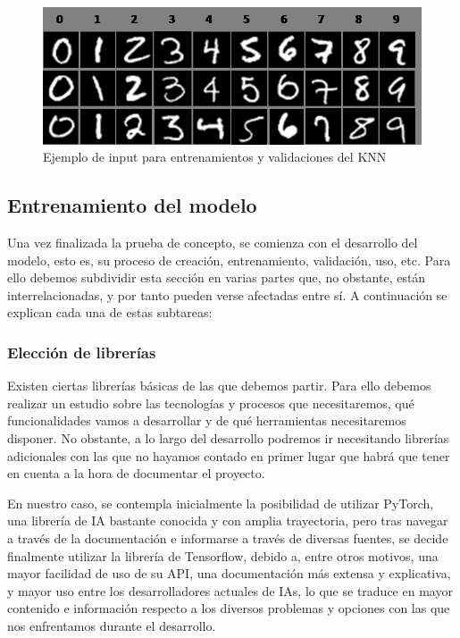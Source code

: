 \documentclass{article}
\begin{document}
\begin{figure}[!ht]
	\centering
	\label{fig:mnist}
	\includegraphics[scale=0.5]{pics/mnist_numbers.png}
	\caption{Ejemplo de input para entrenamientos y validaciones del KNN}
\end{figure}



\subsection{Entrenamiento del modelo}
Una vez finalizada la prueba de concepto, se comienza con el desarrollo del modelo, esto es, su proceso de creación, entrenamiento, validación, uso, etc. Para ello debemos subdividir esta sección en varias partes que, no obstante, están interrelacionadas, y por tanto pueden verse afectadas entre sí. A continuación se explican cada una de estas subtareas:

\subsubsection{Elección de librerías}
Existen ciertas librerías básicas de las que debemos partir. Para ello debemos realizar un estudio sobre las tecnologías y procesos que necesitaremos, qué funcionalidades vamos a desarrollar y de qué herramientas necesitaremos disponer. No obstante, a lo largo del desarrollo podremos ir necesitando librerías adicionales con las que no hayamos contado en primer lugar que habrá que tener en cuenta a la hora de documentar el proyecto.

En nuestro caso, se contempla inicialmente la posibilidad de utilizar PyTorch, una librería de IA bastante conocida y con amplia trayectoria, pero tras navegar a través de la documentación e informarse a través de diversas fuentes, se decide finalmente utilizar la librería de Tensorflow, debido a, entre otros motivos, una mayor facilidad de uso de su API, una documentación más extensa y explicativa, y mayor uso entre los desarrolladores actuales de IAs, lo que se traduce en mayor contenido e información respecto a los diversos problemas y opciones con las que nos enfrentamos durante el desarrollo.
\end{document}
